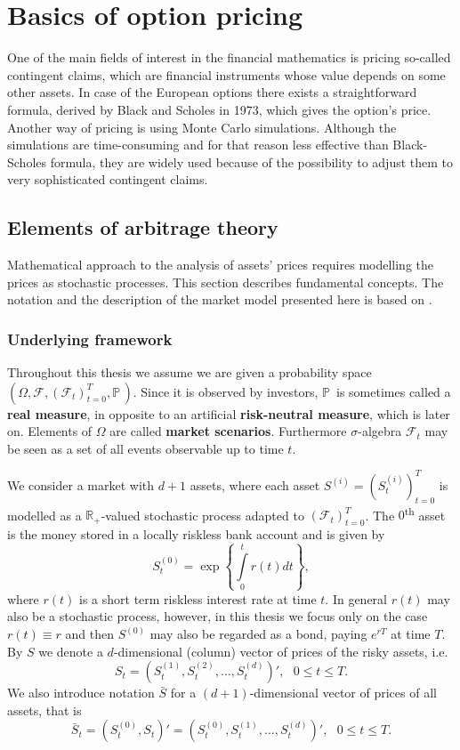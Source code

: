\documentclass[a4paper,11pt, twoside]{book}
\theoremstyle{definition}
\theoremstyle{remark}
\def\P{{\mathbb{P}}\,}
\def\R{{\mathbb{R}}}
\def\Sa{\bar{S}}
\begin{document}
\chapter{Basics of option pricing}
One of the main fields of interest in the financial mathematics is pricing so-called contingent claims, which are financial instruments whose value depends on some other assets. In case of the European options there exists a straightforward formula, derived by Black and Scholes in 1973, which gives the option's price. Another way of pricing is using Monte Carlo simulations.
Although the simulations are time-consuming and for that reason less effective than Black-Scholes formula, they are widely used because of the possibility to adjust them to very sophisticated contingent claims. 

\section{Elements of arbitrage theory}
Mathematical approach to the analysis of assets' prices requires modelling the prices as stochastic processes. This section describes fundamental concepts. The notation and the description of the market model presented here is based on \cite{follmer}.

\subsection{Underlying framework}
Throughout this thesis we assume we are given a probability space $(\Omega, \mathcal{F}, (\mathcal{F}_t)_{t=0}^T, \P)$. Since it is observed by investors, $\P$ is sometimes called a \textbf{real measure}, in opposite to an artificial \textbf{risk-neutral measure}, which is later on. Elements of $\Omega$ are called \textbf{market scenarios}.
Furthermore $\sigma$-algebra $\mathcal{F}_t$ may be seen as a set of all events observable up to time $t$.

We consider a market with $d+1$ assets, where each asset $S^{(i)} = (S^{(i)}_t)_{t=0}^T$ is modelled as a $\R_+$-valued stochastic process adapted to $(\mathcal{F}_t)_{t=0}^T$. The $0$\textsuperscript{th} asset is the money stored in a locally riskless bank account and is given by 
\[S^{(0)}_t = \exp\left\{ \int\limits_0^t r(t)dt \right\},\]
where $r(t)$ is a short term riskless interest rate at time $t$. In general $r(t)$ may also be a stochastic process, however, in this thesis we focus only on the case $r(t) \equiv r$ and then $S^{(0)}$ may also be regarded as a bond, paying $e^{rT}$ at time $T$. By $S$ we denote a $d$-dimensional (column) vector of prices of the risky assets, i.e.
\begin{equation*}
 S_t = (S^{(1)}_t, S^{(2)}_t, \ldots, S^{(d)}_t)', \ \ \ 0 \leq t \leq T.
\end{equation*}
We also introduce notation $\Sa$ for a $(d+1)$-dimensional vector of prices of all assets, that is
\begin{equation*}
 \Sa_t = (S^{(0)}_t, S_t)' = (S^{(0)}_t, S^{(1)}_t, \ldots, S^{(d)}_t)', \ \ \ 0 \leq t \leq T.
\end{equation*}
\end{document}
